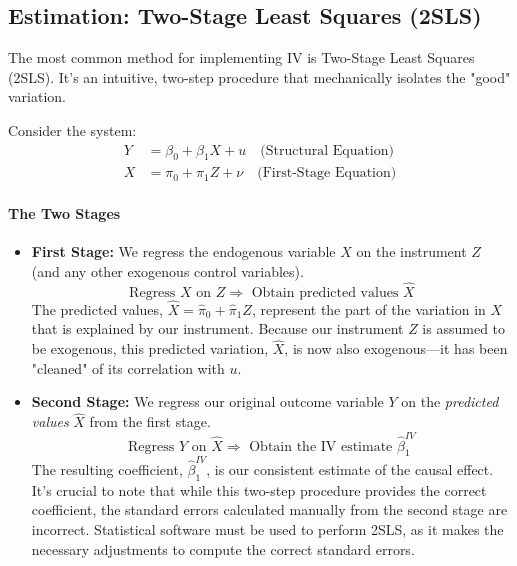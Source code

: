 \documentclass{article}
\providecommand{\tightlist}{
  \setlength{\itemsep}{0pt}
  \setlength{\parskip}{0pt}}
\begin{document}
\subsection{Estimation: Two-Stage Least Squares (2SLS)}
\label{sub:2sls}

The most common method for implementing IV is Two-Stage Least Squares (2SLS). It's an intuitive, two-step procedure that mechanically isolates the "good" variation.

Consider the system:
\begin{align*}
    Y &= \beta_0 + \beta_1 X + u \quad \text{(Structural Equation)} \\
    X &= \pi_0 + \pi_1 Z + \nu \quad \text{(First-Stage Equation)}
\end{align*}

\paragraph{The Two Stages}
\begin{itemize}
    \tightlist
    \item \textbf{First Stage:} We regress the endogenous variable $X$ on the instrument $Z$ (and any other exogenous control variables).
    \begin{equation}
        \text{Regress } X \text{ on } Z \Rightarrow \text{ Obtain predicted values } \hat{X}
    \end{equation}
    The predicted values, $\hat{X} = \hat{\pi}_0 + \hat{\pi}_1 Z$, represent the part of the variation in $X$ that is explained by our instrument. Because our instrument $Z$ is assumed to be exogenous, this predicted variation, $\hat{X}$, is now also exogenous—it has been "cleaned" of its correlation with $u$.
    
    \item \textbf{Second Stage:} We regress our original outcome variable $Y$ on the \textit{predicted values} $\hat{X}$ from the first stage.
    \begin{equation}
        \text{Regress } Y \text{ on } \hat{X} \Rightarrow \text{ Obtain the IV estimate } \hat{\beta}_1^{IV}
    \end{equation}
    The resulting coefficient, $\hat{\beta}_1^{IV}$, is our consistent estimate of the causal effect. It's crucial to note that while this two-step procedure provides the correct coefficient, the standard errors calculated manually from the second stage are incorrect. Statistical software must be used to perform 2SLS, as it makes the necessary adjustments to compute the correct standard errors.
\end{itemize}
\end{document}
